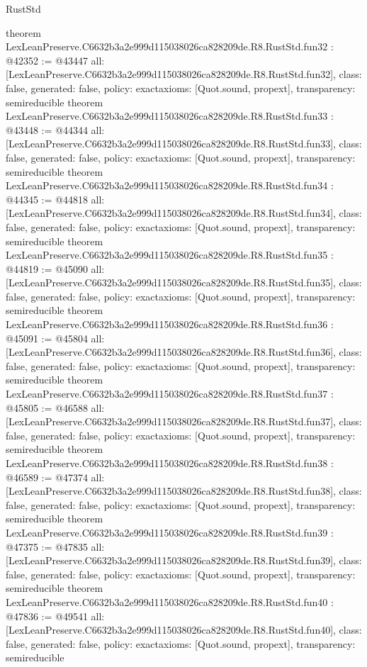 \begin{lexlean}{RustStd}
\begin{coremodule}
{}
theorem LexLeanPreserve.C6632b3a2e999d115038026ca828209de.R8.RustStd.fun32 : @42352 := @43447 {
  all: [LexLeanPreserve.C6632b3a2e999d115038026ca828209de.R8.RustStd.fun32],
  class: false,
  generated: false,
  policy: exact{axioms: [Quot.sound, propext]},
  transparency: semireducible
}
theorem LexLeanPreserve.C6632b3a2e999d115038026ca828209de.R8.RustStd.fun33 : @43448 := @44344 {
  all: [LexLeanPreserve.C6632b3a2e999d115038026ca828209de.R8.RustStd.fun33],
  class: false,
  generated: false,
  policy: exact{axioms: [Quot.sound, propext]},
  transparency: semireducible
}
theorem LexLeanPreserve.C6632b3a2e999d115038026ca828209de.R8.RustStd.fun34 : @44345 := @44818 {
  all: [LexLeanPreserve.C6632b3a2e999d115038026ca828209de.R8.RustStd.fun34],
  class: false,
  generated: false,
  policy: exact{axioms: [Quot.sound, propext]},
  transparency: semireducible
}
theorem LexLeanPreserve.C6632b3a2e999d115038026ca828209de.R8.RustStd.fun35 : @44819 := @45090 {
  all: [LexLeanPreserve.C6632b3a2e999d115038026ca828209de.R8.RustStd.fun35],
  class: false,
  generated: false,
  policy: exact{axioms: [Quot.sound, propext]},
  transparency: semireducible
}
theorem LexLeanPreserve.C6632b3a2e999d115038026ca828209de.R8.RustStd.fun36 : @45091 := @45804 {
  all: [LexLeanPreserve.C6632b3a2e999d115038026ca828209de.R8.RustStd.fun36],
  class: false,
  generated: false,
  policy: exact{axioms: [Quot.sound, propext]},
  transparency: semireducible
}
theorem LexLeanPreserve.C6632b3a2e999d115038026ca828209de.R8.RustStd.fun37 : @45805 := @46588 {
  all: [LexLeanPreserve.C6632b3a2e999d115038026ca828209de.R8.RustStd.fun37],
  class: false,
  generated: false,
  policy: exact{axioms: [Quot.sound, propext]},
  transparency: semireducible
}
theorem LexLeanPreserve.C6632b3a2e999d115038026ca828209de.R8.RustStd.fun38 : @46589 := @47374 {
  all: [LexLeanPreserve.C6632b3a2e999d115038026ca828209de.R8.RustStd.fun38],
  class: false,
  generated: false,
  policy: exact{axioms: [Quot.sound, propext]},
  transparency: semireducible
}
theorem LexLeanPreserve.C6632b3a2e999d115038026ca828209de.R8.RustStd.fun39 : @47375 := @47835 {
  all: [LexLeanPreserve.C6632b3a2e999d115038026ca828209de.R8.RustStd.fun39],
  class: false,
  generated: false,
  policy: exact{axioms: [Quot.sound, propext]},
  transparency: semireducible
}
theorem LexLeanPreserve.C6632b3a2e999d115038026ca828209de.R8.RustStd.fun40 : @47836 := @49541 {
  all: [LexLeanPreserve.C6632b3a2e999d115038026ca828209de.R8.RustStd.fun40],
  class: false,
  generated: false,
  policy: exact{axioms: [Quot.sound, propext]},
  transparency: semireducible
}
\end{coremodule}
\end{lexlean}
